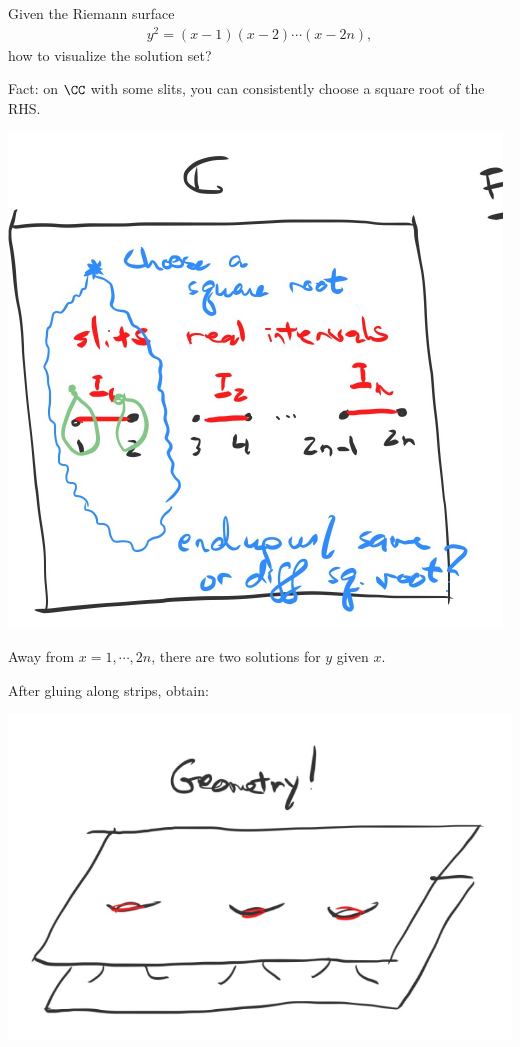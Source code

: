 \begin{example}

Given the Riemann surface
\begin{align*}  
y^2 = (x-1)(x-2)\cdots(x-2n)
,\end{align*} how to visualize the solution set?

Fact: on \(\CC\) with some slits, you can consistently choose a square
root of the RHS.

\includegraphics{figures/image_2020-08-21-01-31-47.png}

Away from \(x=1, \cdots, 2n\), there are two solutions for \(y\) given
\(x\).

After gluing along strips, obtain:

\includegraphics{figures/image_2020-08-21-01-32-48.png}

\end{example}

